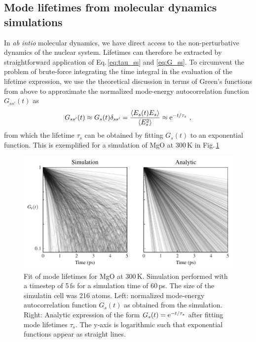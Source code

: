 \subsection{Mode lifetimes from molecular dynamics simulations}
In \emph{ab intio} molecular dynamics, we have direct access to the non-perturbative dynamics of the nuclear system. Lifetimes can therefore be extracted by straightforward application of Eq.\,\eqref{eq:tau_ss} and \eqref{eq:G_ss}. To circumvent the problem of brute-force integrating the time integral in the evaluation of the lifetime expression, we use the theoretical discussion in terms of Green's functions from above to approximate the normalized mode-energy autocorrelation function $G_{ss'} (t)$ as
\begin{align}
	G_{ss'} (t) \approx G_s (t) \delta_{ss'} = \frac{\braket{E_s (t) E_s}}{\braket{E^2_s}}
		\approx  {\rm e}^{-t / \tau_s}~,
	\label{eq:G_s}
\end{align}
from which the lifetime $\tau_s$ can be obtained by fitting $G_s (t)$ to an exponential function. This is exemplified for a simulation of MgO at 300\,K in Fig.\,\ref{fig:G_s}
\begin{figure}
	\includegraphics[width=\textwidth]{./data/plots/lifetimes/greenkubo_summary_interpolation_lifetimes.pdf}
	\caption{Fit of mode lifetimes for MgO at 300\,K. Simulation performed with a timestep of 5\,fs for a simulation time of 60\,ps. The size of the simulatin cell was 216 atoms. Left: normalized mode-energy autocorrelation function $G_s (t)$ as obtained from the simulation. Right: Analytic expression of the form $G_s (t) = {\rm e}^{-t / \tau_s}$ after fitting mode lifetimes $\tau_s$. The y-axis is logarithmic such that exponential functions appear as straight lines.}
	\label{fig:G_s}
\end{figure}

